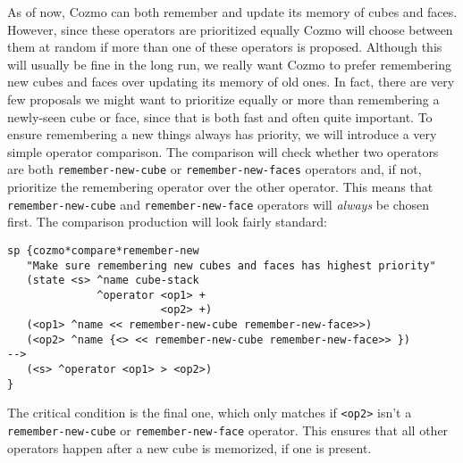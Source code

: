 As of now, Cozmo can both remember and update its memory of cubes and
faces. However, since these operators are prioritized equally Cozmo will
choose between them at random if more than one of these operators is
proposed. Although this will usually be fine in the long run, we really
want Cozmo to prefer remembering new cubes and faces over updating its
memory of old ones. In fact, there are very few proposals we might want
to prioritize equally or more than remembering a newly-seen cube or
face, since that is both fast and often quite important. To ensure
remembering a new things always has priority, we will introduce a very
simple operator comparison. The comparison will check whether two
operators are both \texttt{remember-new-cube} or
\texttt{remember-new-faces} operators and, if not, prioritize the
remembering operator over the other operator. This means that
\texttt{remember-new-cube} and \texttt{remember-new-face} operators will
\emph{always} be chosen first. The comparison production will look
fairly standard:

\begin{verbatim}
sp {cozmo*compare*remember-new
   "Make sure remembering new cubes and faces has highest priority"
   (state <s> ^name cube-stack
              ^operator <op1> +
                        <op2> +)
   (<op1> ^name << remember-new-cube remember-new-face>>)
   (<op2> ^name {<> << remember-new-cube remember-new-face>> })
-->
   (<s> ^operator <op1> > <op2>)
}
\end{verbatim}

The critical condition is the final one, which only matches if
\texttt{\textless{}op2\textgreater{}} isn't a \texttt{remember-new-cube}
or \texttt{remember-new-face} operator. This ensures that all other
operators happen after a new cube is memorized, if one is present.
